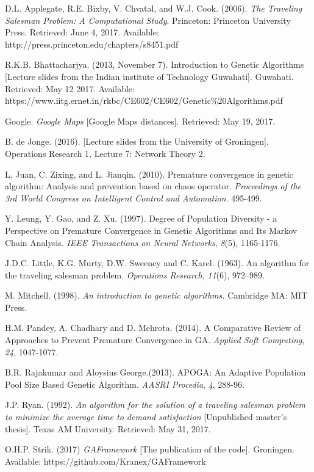 \newpage
\begin{thebibliography}{12}

D.L. Applegate, R.E. Bixby, V. Chvatal, and W.J. Cook. (2006). \textit{The Traveling Salesman Problem: A Computational Study}. Princeton: Princeton University Press. Retrieved: June 4, 2017.
Available: http://press.princeton.edu/chapters/s8451.pdf

R.K.B. Bhattacharjya. (2013, November 7).
Introduction to Genetic Algorithms [Lecture slides from the Indian institute of Technology Guwahati]. Guwahati. Retrieved: May 12 2017. Available: https://www.iitg.ernet.in/rkbc/CE602/CE602/Genetic\%20Algorithms.pdf

Google.
\textit{Google Maps} [Google Maps distances].
Retrieved: May 19, 2017.

 B. de Jonge. (2016). [Lecture slides from the University of Groningen]. Operations Research 1, Lecture 7: Network Theory 2. 

L. Juan, C. Zixing, and L. Jianqin.
(2010). Premature convergence in genetic algorithm: Analysis and prevention based on chaos operator.
\textit{Proceedings of the 3rd World Congress on Intelligent Control and Automation}. 495-499.

Y. Leung, Y. Gao, and Z. Xu. (1997).
Degree of Population Diversity - a Perspective on Premature Convergence in Genetic Algorithms and Its Markov Chain Analysis. \textit{IEEE Transactions on Neural Networks}, \textit{8}(5), 1165-1176. 

J.D.C. Little, K.G. Murty, D.W. Sweeney and C. Karel. (1963). An algorithm for the traveling salesman problem. \textit{Operations Research}, \textit{11}(6), 972–989.

M. Mitchell. (1998).
\textit{ An introduction to genetic algorithms.} Cambridge MA: MIT Press.

H.M. Pandey, A. Chadhary and D. Mehrota.
(2014). A Comparative Review of Approaches to Prevent Premature Convergence in GA. \textit{Applied Soft Computing}, \textit{24}, 1047-1077. 

B.R. Rajakumar and Aloysius George.(2013). APOGA: An Adaptive Population Pool Size Based Genetic Algorithm. \textit{AASRI Procedia}, \textit{4}, 288-96.

J.P. Ryan. (1992). 
\textit{An algorithm for the solution of a traveling salesman problem to minimize the average time to demand satisfaction} [Unpublished master's thesis]. Texas AM University. Retrieved: May 31, 2017.

O.H.P. Strik. (2017)
\textit{GAFramework} [The publication of the code]. 
Groningen. Available: https://github.com/Kranex/GAFramework

\end{thebibliography}



